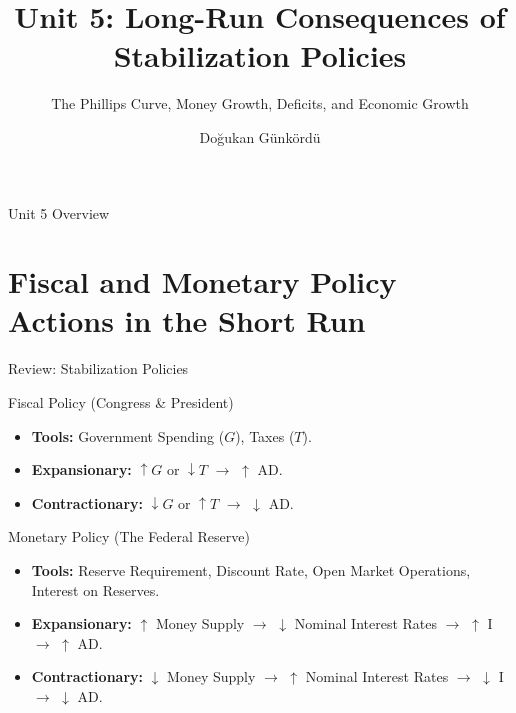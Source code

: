 \documentclass[aspectratio=169]{beamer}
\title{Unit 5: Long-Run Consequences of Stabilization Policies}
\subtitle{The Phillips Curve, Money Growth, Deficits, and Economic Growth}
\author{Doğukan Günkördü}
\date{}
\begin{document}
\begin{frame}
    \titlepage
\end{frame}

\begin{frame}{Unit 5 Overview}
    \tableofcontents
\end{frame}

\section{Fiscal and Monetary Policy Actions in the Short Run}

\begin{frame}{Review: Stabilization Policies}
    \begin{block}{Fiscal Policy (Congress \& President)}
        \begin{itemize}
            \item \textbf{Tools:} Government Spending ($G$), Taxes ($T$).
            \item \textbf{Expansionary:} $\uparrow G$ or $\downarrow T$ $\rightarrow$ $\uparrow$ AD.
            \item \textbf{Contractionary:} $\downarrow G$ or $\uparrow T$ $\rightarrow$ $\downarrow$ AD.
        \end{itemize}
    \end{block}
    
    \begin{block}{Monetary Policy (The Federal Reserve)}
        \begin{itemize}
            \item \textbf{Tools:} Reserve Requirement, Discount Rate, Open Market Operations, Interest on Reserves.
            \item \textbf{Expansionary:} $\uparrow$ Money Supply $\rightarrow$ $\downarrow$ Nominal Interest Rates $\rightarrow$ $\uparrow$ I $\rightarrow$ $\uparrow$ AD.
            \item \textbf{Contractionary:} $\downarrow$ Money Supply $\rightarrow$ $\uparrow$ Nominal Interest Rates $\rightarrow$ $\downarrow$ I $\rightarrow$ $\downarrow$ AD.
        \end{itemize}
    \end{block}
\end{frame}
\end{document}
